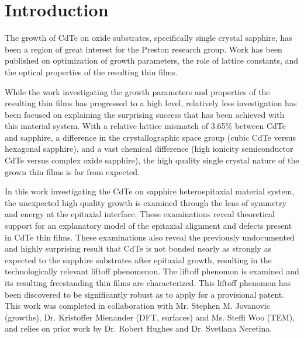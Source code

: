 \section{Introduction}
The growth of CdTe on oxide substrates, specifically single crystal sapphire, has been a region of great interest for the Preston research group.
Work has been published on optimization of growth parameters, the role of lattice constants, and the optical properties of the resulting thin films\cite{Neretina2009a,Neretina2008b,Neretina2009b,Neretina2007,Neretina2006,cdte-optical}.

While the work investigating the growth parameters and properties of the resulting thin films has progressed to a high level, relatively less investigation has been focused on explaining the surprising success that has been achieved with this material system.
With a relative lattice mismatch of 3.65\% between CdTe and sapphire, a difference in the 
crystallographic space group (cubic CdTe versus hexagonal sapphire), and a vast chemical difference (high ionicity semiconductor CdTe versus complex oxide sapphire), the high quality single crystal nature of the grown thin films is far from expected.

In this work investigating the CdTe on sapphire heteroepitaxial material system, the unexpected high quality growth is examined through the lens of symmetry and energy at the epitaxial interface.
These examinations reveal theoretical support for an explanatory model of the epitaxial alignment and defects present in CdTe thin films.
These examinations also reveal the previously undocumented and highly surprising result that CdTe is not bonded nearly as strongly as expected to the sapphire substrates after epitaxial growth, resulting in the technologically relevant liftoff phenomenon.
The liftoff phenomon is examined and its resulting freestanding thin films are characterized.
This liftoff phenomon has been discovered to be significantly robust as to apply for a provisional patent\cite{patent}.
This work was completed in collaboration with Mr.
Stephen M. Jovanovic (growths), Dr.
Kristoffer Mienander (DFT, surfaces) and Ms.
Steffi Woo (TEM), and relies on prior work by Dr.
Robert Hughes and Dr.
Svetlana Neretina.

